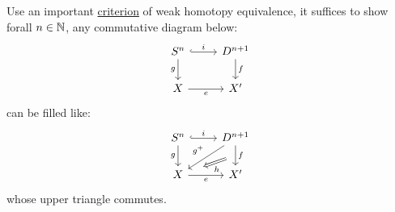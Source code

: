     \begin{prf}
        Use an important \hyperref[hyp:criterion-HELP-Dn+1,Sn]{criterion} of 
        weak homotopy equivalence,
        it suffices to show forall $n \in \mathbb N$,
        any commutative diagram below:
        \[\begin{tikzcd}
            {S^n} & {D^{n+1}} \\
            X & {X'}
            \arrow["i", hook, from=1-1, to=1-2]
            \arrow["g"', from=1-1, to=2-1]
            \arrow["e"', from=2-1, to=2-2]
            \arrow["f", from=1-2, to=2-2]
        \end{tikzcd}\]
        can be filled like:
        \[\begin{tikzcd}
            {S^n} & {D^{n+1}} \\
            {X} & {X'}
            \arrow["i", hook, from=1-1, to=1-2]
            \arrow["g"', from=1-1, to=2-1]
            \arrow["e"', from=2-1, to=2-2]
            \arrow[""{name=0, anchor=center, inner sep=0}, "f", from=1-2, to=2-2]
            \arrow["{g^+}"', from=1-2, to=2-1]
            \arrow["h", shorten <=8pt, shorten >=14pt, Rightarrow, from=0, to=2-1]
        \end{tikzcd}\]
        whose upper triangle commutes.\\


\end{prf}
